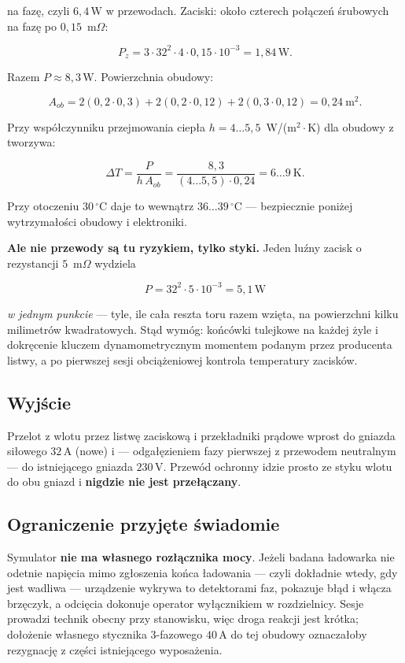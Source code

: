 \documentclass[a4paper,11pt]{article}
\newcommand{\volt}{\,\mathrm{V}}
\newcommand{\amp}{\,\mathrm{A}}
\newcommand{\watt}{\,\mathrm{W}}
\begin{document}
na fazę, czyli $6{,}4\watt$ w przewodach. Zaciski: około czterech połączeń
śrubowych na fazę po $0{,}15$~m$\Omega$:

\[
P_{z}=3\cdot32^2\cdot4\cdot0{,}15\cdot10^{-3}=1{,}84\watt .
\]

Razem $P\approx 8{,}3\watt$. Powierzchnia obudowy:

\[
A_{ob}=2(0{,}2\cdot0{,}3)+2(0{,}2\cdot0{,}12)+2(0{,}3\cdot0{,}12)=0{,}24\ \mathrm{m}^2 .
\]

Przy współczynniku przejmowania ciepła $h=4\ldots5{,}5$~W/(m$^2\cdot$K) dla obudowy
z tworzywa:

\[
\Delta T=\frac{P}{h\,A_{ob}}=\frac{8{,}3}{(4\ldots5{,}5)\cdot0{,}24}=6\ldots9\ \mathrm{K}.
\]

Przy otoczeniu $30\,^\circ$C daje to wewnątrz $36\ldots39\,^\circ$C --- bezpiecznie
poniżej wytrzymałości obudowy i elektroniki.

\textbf{Ale nie przewody są tu ryzykiem, tylko styki.} Jeden luźny zacisk
o rezystancji $5$~m$\Omega$ wydziela

\[
P = 32^2\cdot5\cdot10^{-3}=5{,}1\watt
\]

\emph{w jednym punkcie} --- tyle, ile cała reszta toru razem wzięta, na powierzchni
kilku milimetrów kwadratowych. Stąd wymóg: końcówki tulejkowe na każdej żyle
i dokręcenie kluczem dynamometrycznym momentem podanym przez producenta listwy,
a po pierwszej sesji obciążeniowej kontrola temperatury zacisków.

\subsection{Wyjście}

Przelot z wlotu przez listwę zaciskową i przekładniki prądowe wprost do gniazda
siłowego $32\amp$ (nowe) i --- odgałęzieniem fazy pierwszej z przewodem
neutralnym --- do istniejącego gniazda $230\volt$. Przewód ochronny idzie prosto
ze styku wlotu do obu gniazd i \textbf{nigdzie nie jest przełączany}.

\subsection{Ograniczenie przyjęte świadomie}

Symulator \textbf{nie ma własnego rozłącznika mocy}. Jeżeli badana ładowarka nie
odetnie napięcia mimo zgłoszenia końca ładowania --- czyli dokładnie wtedy, gdy
jest wadliwa --- urządzenie wykrywa to detektorami faz, pokazuje błąd i włącza
brzęczyk, a odcięcia dokonuje operator wyłącznikiem w rozdzielnicy. Sesje prowadzi
technik obecny przy stanowisku, więc droga reakcji jest krótka; dołożenie własnego
stycznika 3-fazowego $40\amp$ do tej obudowy oznaczałoby rezygnację z części
istniejącego wyposażenia.
\end{document}
